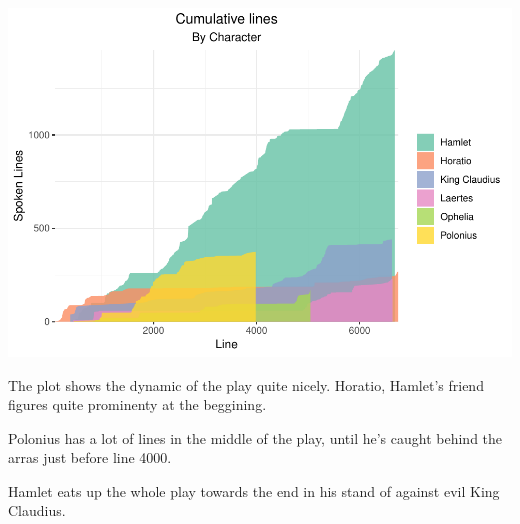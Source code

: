 \documentclass[]{article}
\begin{document}
\includegraphics{2018-08-20-hamlet_files/figure-latex/unnamed-chunk-9-1.pdf}

The plot shows the dynamic of the play quite nicely. Horatio, Hamlet's
friend figures quite prominenty at the beggining.

Polonius has a lot of lines in the middle of the play, until he's caught
behind the arras just before line 4000.

Hamlet eats up the whole play towards the end in his stand of against
evil King Claudius.
\end{document}
